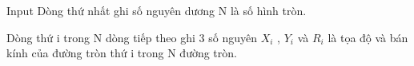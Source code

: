 Input
Dòng thứ nhất ghi số nguyên dương N là số hình tròn.  

   Dòng thứ i trong N dòng tiếp theo ghi 3 số nguyên $X_{i}$   , $Y_{i}$   và $R_{i}$   là tọa độ và bán kính của đường tròn thứ i trong N đường tròn.